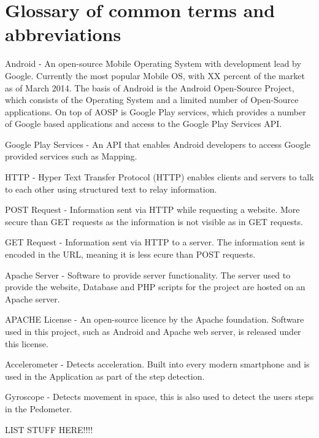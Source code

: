 \documentclass{l4proj}
\begin{document}
\section{Glossary of common terms and abbreviations}

Android - An open-source Mobile Operating System with development lead by Google. Currently the most popular Mobile OS, with XX percent of the market as of March 2014. The basis of Android is the Android Open-Source Project, which consists of the Operating System and a limited number of Open-Source applications. On top of AOSP is Google Play services, which provides a number of Google based applications and access to the Google Play Services API.

Google Play Services - An API that enables Android developers to access Google provided services such as Mapping. 

HTTP - Hyper Text Transfer Protocol (HTTP) enables clients and servers to talk to each other using structured text to relay information.

POST Request - Information sent via HTTP while requesting a website. More secure than GET requests as the information is not visible as in GET requests.

GET Request - Information sent via HTTP to a server. The information sent is encoded in the URL, meaning it is less ecure than POST requests.

Apache Server - Software to provide server functionality. The server used to provide the website, Database and PHP scripts for the project are hosted on an Apache server.

APACHE License - An open-source licence by the Apache foundation. Software used in this project, such as Android and Apache web server, is released under this license.

Accelerometer - Detects acceleration. Built into every modern smartphone and is used in the Application as part of the step detection.

Gyroscope - Detects movement in space, this is also used to detect the users steps in the Pedometer.

LIST STUFF HERE!!!!
\end{document}
